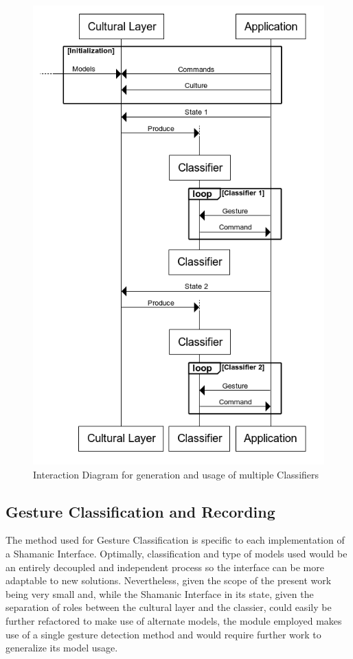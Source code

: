     \begin{figure}[ht]
        \centering
        \includegraphics{figures/SequenceDiagram.png}
        \caption{\label{fig:ShamanicSequenceDiagram}Interaction Diagram for generation and usage of multiple Classifiers}
    \end{figure}

\subsection{Gesture Classification and Recording} \label{sec:develop_Classifiers}
    The method used for Gesture Classification is specific to each implementation of a Shamanic Interface. Optimally, classification and type of models used would be an entirely decoupled and independent process so the interface can be more adaptable to new solutions. Nevertheless, given the scope of the present work being very small and, while the Shamanic Interface in its state, given the separation of roles between the cultural layer and the classier, could easily be further refactored to make use of alternate models, the module employed makes use of a single gesture detection method and would require further work to generalize its model usage.\\
       
